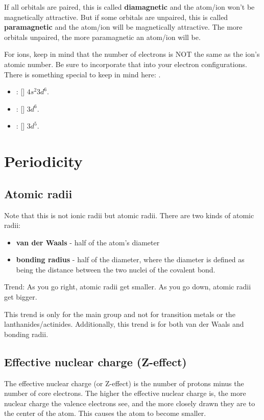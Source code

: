 \documentclass[letterpaper, 12pt]{article}
\begin{document}
	If all orbitals are paired, this is called \textbf{diamagnetic} and the atom/ion won't be magnetically attractive. But if some orbitals are unpaired, this is called \textbf{paramagnetic} and the atom/ion will be magnetically attractive. The more orbitals unpaired, the more paramagnetic an atom/ion will be.
	
	For ions, keep in mind that the number of electrons is NOT the same as the ion's atomic number. Be sure to incorporate that into your electron configurations. There is something special to keep in mind here: .
	
	\begin{itemize}
		\item {}: [] $4s^2 3d^6$.
		\item {}: [] $3d^6$.
		\item {}: [] $3d^5$.
	\end{itemize}

\section{Periodicity}
	\subsection{Atomic radii}
	Note that this is not ionic radii but atomic radii. There are two kinds of atomic radii:
	\begin{itemize}
		\item \textbf{van der Waals} - half of the atom's diameter
		\item \textbf{bonding radius} - half of the diameter, where the diameter is defined as being the distance between the two nuclei of the covalent bond.
	\end{itemize}
	
	Trend: As you go right, atomic radii get smaller. As you go down, atomic radii get bigger.
	
	This trend is only for the main group and not for transition metals or the lanthanides/actinides. Additionally, this trend is for both van der Waals and bonding radii.
	
	\subsection{Effective nuclear charge (Z-effect)}
	The effective nuclear charge (or Z-effect) is the number of protons minus the number of core electrons. The higher the effective nuclear charge is, the more nuclear charge the valence electrons see, and the more closely drawn they are to the center of the atom. This causes the atom to become smaller.
	
\end{document}
